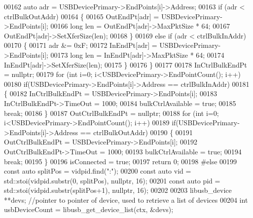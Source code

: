 \begin{DoxyCode}
00162         \textcolor{keyword}{auto} adr = USBDevicePrimary->EndPoints[i]->Address;
00163         \textcolor{keywordflow}{if} (adr < ctrlBulkOutAddr)
00164         \{
00165             OutEndPt[adr] = USBDevicePrimary->EndPoints[i];
00166             \textcolor{keywordtype}{long} len = OutEndPt[adr]->MaxPktSize * 64;
00167             OutEndPt[adr]->SetXferSize(len);
00168         \}
00169         \textcolor{keywordflow}{else} \textcolor{keywordflow}{if} (adr < ctrlBulkInAddr)
00170         \{
00171             adr &= 0xF;
00172             InEndPt[adr] = USBDevicePrimary->EndPoints[i];
00173             \textcolor{keywordtype}{long} len = InEndPt[adr]->MaxPktSize * 64;
00174             InEndPt[adr]->SetXferSize(len);
00175         \}
00176     \}
00177 
00178     InCtrlBulkEndPt = \textcolor{keyword}{nullptr};
00179     \textcolor{keywordflow}{for} (\textcolor{keywordtype}{int} i=0; i<USBDevicePrimary->EndPointCount(); i++)
00180         \textcolor{keywordflow}{if}(USBDevicePrimary->EndPoints[i]->Address == ctrlBulkInAddr)
00181         \{
00182             InCtrlBulkEndPt = USBDevicePrimary->EndPoints[i];
00183             InCtrlBulkEndPt->TimeOut = 1000;
00184             bulkCtrlAvailable = \textcolor{keyword}{true};
00185             \textcolor{keywordflow}{break};
00186         \}
00187     OutCtrlBulkEndPt = \textcolor{keyword}{nullptr};
00188     \textcolor{keywordflow}{for} (\textcolor{keywordtype}{int} i=0; i<USBDevicePrimary->EndPointCount(); i++)
00189         \textcolor{keywordflow}{if}(USBDevicePrimary->EndPoints[i]->Address == ctrlBulkOutAddr)
00190         \{
00191             OutCtrlBulkEndPt = USBDevicePrimary->EndPoints[i];
00192             OutCtrlBulkEndPt->TimeOut = 1000;
00193             bulkCtrlAvailable = \textcolor{keyword}{true};
00194             \textcolor{keywordflow}{break};
00195         \}
00196     isConnected = \textcolor{keyword}{true};
00197     \textcolor{keywordflow}{return} 0;
00198 \textcolor{preprocessor}{#else}
00199     \textcolor{keyword}{const} \textcolor{keyword}{auto} splitPos = vidpid.find(\textcolor{stringliteral}{":"});
00200     \textcolor{keyword}{const} \textcolor{keyword}{auto} vid = std::stoi(vidpid.substr(0, splitPos), \textcolor{keyword}{nullptr}, 16);
00201     \textcolor{keyword}{const} \textcolor{keyword}{auto} pid = std::stoi(vidpid.substr(splitPos+1), \textcolor{keyword}{nullptr}, 16);
00202 
00203     libusb\_device **devs; \textcolor{comment}{//pointer to pointer of device, used to retrieve a list of devices}
00204     \textcolor{keywordtype}{int} usbDeviceCount = libusb\_get\_device\_list(ctx, &devs);

\end{DoxyCode}
